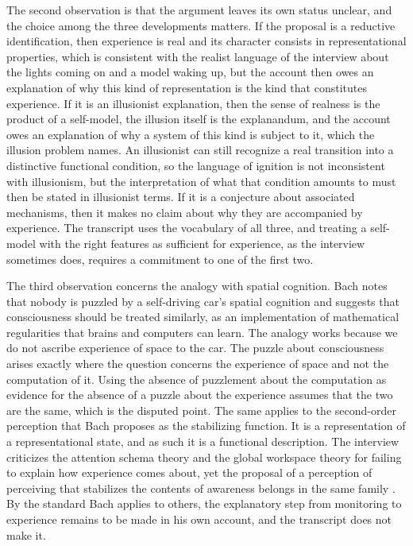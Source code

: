 \documentclass[11pt]{article}
\begin{document}
The second observation is that the argument leaves its own status unclear, and the choice among the three developments matters. If the proposal is a reductive identification, then experience is real and its character consists in representational properties, which is consistent with the realist language of the interview about the lights coming on and a model waking up, but the account then owes an explanation of why this kind of representation is the kind that constitutes experience. If it is an illusionist explanation, then the sense of realness is the product of a self-model, the illusion itself is the explanandum, and the account owes an explanation of why a system of this kind is subject to it, which the illusion problem names. An illusionist can still recognize a real transition into a distinctive functional condition, so the language of ignition is not inconsistent with illusionism, but the interpretation of what that condition amounts to must then be stated in illusionist terms. If it is a conjecture about associated mechanisms, then it makes no claim about why they are accompanied by experience. The transcript uses the vocabulary of all three, and treating a self-model with the right features as sufficient for experience, as the interview sometimes does, requires a commitment to one of the first two.

The third observation concerns the analogy with spatial cognition. Bach notes that nobody is puzzled by a self-driving car's spatial cognition and suggests that consciousness should be treated similarly, as an implementation of mathematical regularities that brains and computers can learn. The analogy works because we do not ascribe experience of space to the car. The puzzle about consciousness arises exactly where the question concerns the experience of space and not the computation of it. Using the absence of puzzlement about the computation as evidence for the absence of a puzzle about the experience assumes that the two are the same, which is the disputed point. The same applies to the second-order perception that Bach proposes as the stabilizing function. It is a representation of a representational state, and as such it is a functional description. The interview criticizes the attention schema theory and the global workspace theory for failing to explain how experience comes about, yet the proposal of a perception of perceiving that stabilizes the contents of awareness belongs in the same family \cite{graziano2013,baars1988}. By the standard Bach applies to others, the explanatory step from monitoring to experience remains to be made in his own account, and the transcript does not make it.
\end{document}
